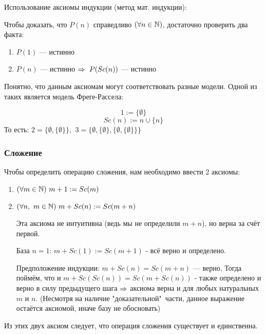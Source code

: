 \begin{note}
    Использование аксиомы индукции (метод мат. индукции):

    Чтобы доказать, что $P(n)$ справедливо $(\forall n \in \mathbb{N})$,
    достаточно проверить два факта:
    \begin{enumerate}
        \item $P(1)$ --- истинно 
        \item $P(n)$ --- истинно $\Rightarrow \ P(Sc(n))$ --- истинно 
    \end{enumerate}
\end{note}

\begin{example}
    Понятно, что данным аксиомам могут соответствовать
    разные модели. Одной из таких является модель Фреге-Рассела:
    
    \[1 := \{\emptyset\}\]
    \[Sc(n) := n \cup \{n\}\]
    То есть:
    $2 = \{\emptyset, \{\emptyset\}\}$,
    $\ 3 = \{\emptyset, \{\emptyset\}, \{\emptyset,\{\emptyset\}\}\}$
\end{example}

\subsubsection*{Сложение}

Чтобы определить операцию сложения, нам необходимо
ввести 2 аксиомы:
\begin{enumerate}
    \item $(\forall m \in \mathbb{N})\ m + 1 := Sc(m)$
    \item $(\forall n,\ m \in \mathbb{N})\ m + Sc(n) := Sc(m + n)$
    \begin{note}
        Эта аксиома не интуитивна (ведь мы не определили
        $m + n$), но верна за счёт первой.
        
        База $n = 1$: $m + Sc(1) := Sc(m + 1)$ - всё верно и определено.

        Предположение индукции: $m + Sc(n) = Sc(m + n)$ --- верно.
        Тогда поймём, что и
        $m + Sc(Sc(n)) = Sc(m + Sc(n))$ - также определено и
        верно в силу предыдущего шага
        $\Rightarrow$ аксиома верна и для любых натуральных $m$ и $n$.
        (Несмотря на наличие "доказательной"\ 
        части, данное выражение остаётся аксиомой, иначе базу
        не обосновать)
    \end{note}
\end{enumerate}

Из этих двух аксиом следует, что операция сложения
существует и единственна.

